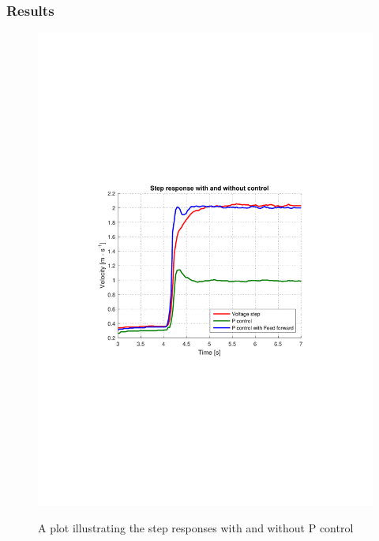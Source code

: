 \subsubsection{Results}
\begin{figure}[H]
  \centering
  {
    \includegraphics[width=1.4\textwidth]{figures/stepWithPControl.pdf}
  }
  \caption{A plot illustrating the step responses with and without P control}
  \label{PconTest}
\end{figure}\vspace{-5mm}

